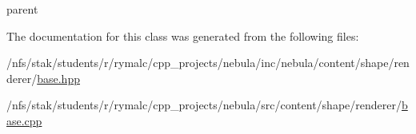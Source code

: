parent 

The documentation for this class was generated from the following files:\begin{DoxyCompactItemize}
\item 
/nfs/stak/students/r/rymalc/cpp\_\-projects/nebula/inc/nebula/content/shape/renderer/\hyperlink{inc_2nebula_2content_2shape_2renderer_2base_8hpp}{base.hpp}\item 
/nfs/stak/students/r/rymalc/cpp\_\-projects/nebula/src/content/shape/renderer/\hyperlink{src_2content_2shape_2renderer_2base_8cpp}{base.cpp}\end{DoxyCompactItemize}
